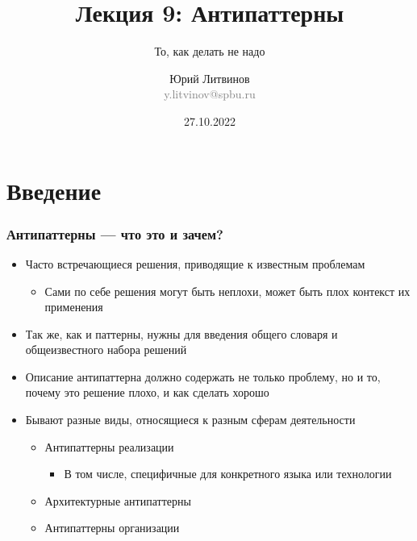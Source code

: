 \documentclass[xetex,mathserif,serif]{beamer}
\title{Лекция 9: Антипаттерны}
\subtitle{То, как делать не надо}
\author[Юрий Литвинов]{Юрий Литвинов\\\small{\textcolor{gray}{y.litvinov@spbu.ru}}}
\date{27.10.2022}
\begin{document}
    
    \frame{\titlepage}

    \section{Введение}

    \begin{frame}
        \frametitle{Антипаттерны --- что это и зачем?}
        \begin{itemize}
            \item Часто встречающиеся решения, приводящие к известным проблемам
            \begin{itemize}
                \item Сами по себе решения могут быть неплохи, может быть плох контекст их применения
            \end{itemize}
            \item Так же, как и паттерны, нужны для введения общего словаря и общеизвестного набора решений
            \item Описание антипаттерна должно содержать не только проблему, но и то, почему это решение плохо, и как сделать хорошо
            \item Бывают разные виды, относящиеся к разным сферам деятельности
            \begin{itemize}
                \item Антипаттерны реализации
                \begin{itemize}
                    \item В том числе, специфичные для конкретного языка или технологии
                \end{itemize}
                \item Архитектурные антипаттерны
                \item Антипаттерны организации
            \end{itemize}
        \end{itemize}
    \end{frame}
\end{document}
